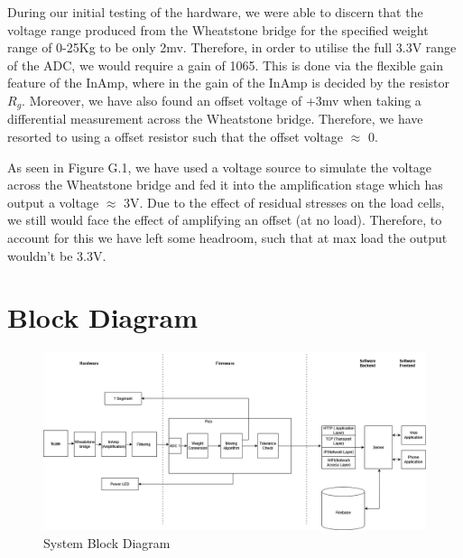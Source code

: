 During our initial testing of the hardware, we were able to discern that the voltage range produced from the Wheatstone bridge for the specified weight range of 0-25Kg to be only 2mv. Therefore, in order to utilise the full 3.3V range of the ADC, we would require a gain of 1065. This is done via the flexible gain feature of the InAmp, where in the gain of the InAmp is decided by the resistor $R_{g}$. Moreover, we have also found an offset voltage of +3mv when taking a differential measurement across the Wheatstone bridge. Therefore, we have resorted to using a offset resistor such that the offset voltage $\approx$ 0.

As seen in Figure G.1, we have used a voltage source to simulate the voltage across the Wheatstone bridge and fed it into the amplification stage which has output a voltage $\approx$ 3V. Due to the effect of residual stresses on the load cells, we still would face the effect of amplifying an offset (at no load). Therefore, to account for this we have left some headroom, such that at max load the output wouldn't be 3.3V.

\chapter{Block Diagram}

\begin{figure}
\centering
\includegraphics[width=1\textwidth]{images/Block Diagram Hardware.drawio.png}
\caption{System Block Diagram}\label{appendix:block_diagram}
\end{figure}
